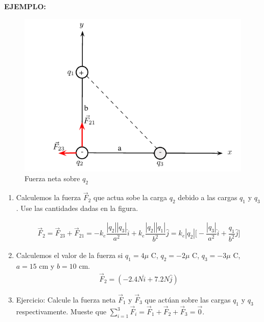 \vspace{1.0 cm}

\textbf{EJEMPLO:} 

\begin{figure}[h]
\begin{center}
\includegraphics[scale=1.0]{electrostatica/interaccionelectrica1}
\end{center}
\caption{Fuerza neta sobre $q_2$}
\end{figure}

\begin{enumerate}
\item Calculemos la fuerza $\vec{F}_2$ que actua sobe la carga $q_2$ debido a las cargas $q_1$ y $q_3$. Use las cantidades dadas en la figura.

\begin{eqnarray}
\vec{F}_2=\vec{F}_{23}+\vec{F}_{21} =- k_e \dfrac{|q_2||q_3|}{a^2}\hat{i}+k_e \dfrac{|q_2||q_1|}{b^2}\hat{j}=k_e|q_2|\bigg[- \dfrac{|q_3|}{a^2}\hat{i}+\dfrac{q_1}{b^2}\hat{j}\bigg]
\end{eqnarray}

\item Calculemos el valor de la fuerza si $q_1=4 \mu$ C, $q_2=-2 \mu$ C, $q_3=-3\mu$ C, $a=15$ cm y $b= 10$ cm.
\begin{eqnarray}
\vec{F}_2=(-2.4 N \hat{i}+7.2 N \hat{j})
\end{eqnarray}
\item Ejercicio: Calcule la fuerza neta $\vec{F}_1$ y $\vec{F}_3$ que actúan sobre las cargas $q_1$ y $q_3$ respectivamente. Mueste que $\sum_{i=1}^{3} \vec{F}_i=\vec{F}_1+\vec{F}_2+\vec{F}_3=\vec{0}$.
\end{enumerate}

